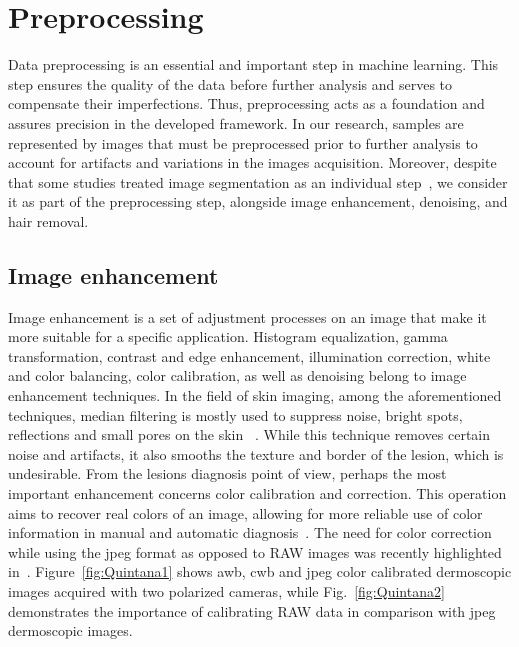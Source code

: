 \section{Preprocessing} \label{sec:chp2-sec2}
Data preprocessing is an essential and important step in machine learning. 
This step ensures the quality of the data before further analysis and serves to compensate their imperfections. 
Thus, preprocessing acts as a foundation and assures precision in the developed framework.
In our research, samples are represented by images that must be preprocessed prior to further analysis to account for artifacts and variations in the images acquisition.
Moreover, despite that some studies treated image segmentation as an individual step~\cite{barata2013towards,capdehourat2009pigmented,celebi2007methodological}, we consider it as part of the preprocessing step, alongside image enhancement, denoising, and hair removal.



\subsection{Image enhancement}\label{subsec:pp-enh}
Image enhancement is a set of adjustment processes on an image that make it more suitable for a specific application. 
Histogram equalization, gamma transformation, contrast and edge enhancement, illumination correction, white and color balancing, color calibration, as well as denoising belong to image enhancement techniques. 
In the field of skin imaging, among the aforementioned techniques, median filtering is mostly used to suppress noise, bright spots, reflections and small pores on the skin ~\cite{Chiem2007,Berenguer2009,Ruiz2011}. 
While this technique removes certain noise and artifacts, it also smooths the texture and border of the lesion, which is undesirable. 
From the lesions diagnosis point of view, perhaps the most important enhancement concerns color calibration and correction. 
This operation aims to recover real colors of an image, allowing for more reliable use of color information in manual and automatic diagnosis~\cite{korotkov2012computerized}. 
The need for color correction while using the \acf{jpeg} format as opposed to RAW images was recently highlighted in~\cite{Quintana2011,Wighton2011a,celebiautomated}.
Figure~\ref{fig:Quintana1} shows \acf{awb}, \acf{cwb} and \ac{jpeg} color calibrated dermoscopic images acquired with two polarized cameras, while 
Fig.~\ref{fig:Quintana2} demonstrates the importance of calibrating RAW data in comparison with \ac{jpeg} dermoscopic images.



